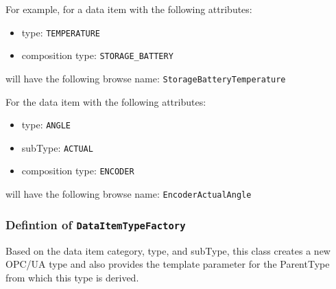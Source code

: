 \begin{itemize}
For example, for a data item with the following attributes:

\begin{itemize}
\item type: \texttt{TEMPERATURE}
\item composition type: \texttt{STORAGE_BATTERY}
\end{itemize}

will have the following browse name: \texttt{StorageBatteryTemperature}

For the data item with the following attributes:

\begin{itemize}
\item type: \texttt{ANGLE}
\item subType: \texttt{ACTUAL}
\item composition type: \texttt{ENCODER}
\end{itemize}

will have the following browse name: \texttt{EncoderActualAngle}


\end{itemize}
\subsubsection{Defintion of \texttt{DataItemTypeFactory}} \label{type:DataItemTypeFactory}

\FloatBarrier

Based on the data item category, type, and subType, this class creates a new OPC/UA type 
and also provides the template parameter for the ParentType from which this type is derived. 


